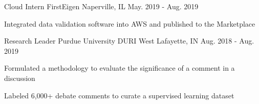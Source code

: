 \begin{cventries}
  \cventry
    {Cloud Intern} %
    {FirstEigen} %
    {Naperville, IL} %
    {May. 2019 - Aug. 2019} %
    {
      \begin{cvitems} %
        \item{Integrated data validation software into AWS and published to the Marketplace}
      \end{cvitems}
    }

  \cventry
    {Research Leader} %
    {Purdue University DURI} %
    {West Lafayette, IN} %
    {Aug. 2018 - Aug. 2019} %
    {
      \begin{cvitems} %
      \item{Formulated a methodology to evaluate the significance of a comment in a discussion }
        \item{Labeled 6,000+ debate comments to curate a supervised learning dataset}
      \end{cvitems}
    }
\end{cventries}


 
